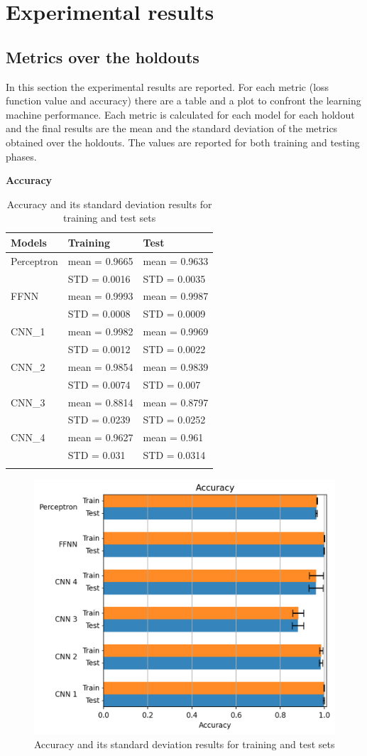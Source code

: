 \section{Experimental results}\label{header-n500}

\subsection{Metrics over the holdouts}\label{header-n501}

In this section the experimental results are reported. For each metric
(loss function value and accuracy) there are a table and a plot to
confront the learning machine performance. Each metric is calculated for
each model for each holdout and the final results are the mean and the
standard deviation of the metrics obtained over the holdouts. The values
are reported for both training and testing phases.

\newpage
\textbf{Accuracy}

\begin{longtable}[]{@{}lll@{}}
\toprule
\textbf{Models} & \textbf{Training} & \textbf{Test}\tabularnewline
\midrule
\endhead
Perceptron & mean = 0.9665 & mean = 0.9633\tabularnewline
& STD = 0.0016 & STD = 0.0035\tabularnewline
FFNN & mean = 0.9993 & mean = 0.9987\tabularnewline
& STD = 0.0008 & STD = 0.0009\tabularnewline
CNN\_1 & mean = 0.9982 & mean = 0.9969\tabularnewline
& STD = 0.0012 & STD = 0.0022\tabularnewline
CNN\_2 & mean = 0.9854 & mean = 0.9839\tabularnewline
& STD = 0.0074 & STD = 0.007\tabularnewline
CNN\_3 & mean = 0.8814 & mean = 0.8797\tabularnewline
& STD = 0.0239 & STD = 0.0252\tabularnewline
CNN\_4 & mean = 0.9627 & mean = 0.961\tabularnewline
& STD = 0.031 & STD = 0.0314\tabularnewline
\bottomrule
\caption{Accuracy and its standard deviation results for training and test sets}
\end{longtable}

\begin{figure}[h!]
	\centering
	\includegraphics[width=0.85\linewidth]{../images/accuracy.png}
	\caption{Accuracy and its standard deviation results for training and test sets}
\end{figure}

